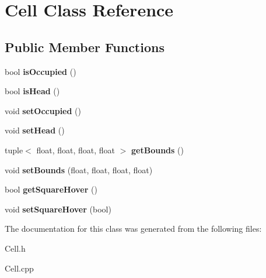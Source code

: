 \hypertarget{classCell}{}\section{Cell Class Reference}
\label{classCell}
\subsection*{Public Member Functions}
\begin{DoxyCompactItemize}
\item 
bool {\bfseries is\+Occupied} ()\hypertarget{classCell_a5f18a8962841567498aec286d23f153c}{}\label{classCell_a5f18a8962841567498aec286d23f153c}

\item 
bool {\bfseries is\+Head} ()\hypertarget{classCell_a071d12e8c85897affa572e71f681b7ab}{}\label{classCell_a071d12e8c85897affa572e71f681b7ab}

\item 
void {\bfseries set\+Occupied} ()\hypertarget{classCell_a4c6f53c6da9c60f6389873a50ce9d206}{}\label{classCell_a4c6f53c6da9c60f6389873a50ce9d206}

\item 
void {\bfseries set\+Head} ()\hypertarget{classCell_a94f6061a611acdee0a8eac2cbffd4e99}{}\label{classCell_a94f6061a611acdee0a8eac2cbffd4e99}

\item 
tuple$<$ float, float, float, float $>$ {\bfseries get\+Bounds} ()\hypertarget{classCell_a9ba09bf14fe823ba830e134febdd8301}{}\label{classCell_a9ba09bf14fe823ba830e134febdd8301}

\item 
void {\bfseries set\+Bounds} (float, float, float, float)\hypertarget{classCell_a743b44fced5dac88229c9533a604fc10}{}\label{classCell_a743b44fced5dac88229c9533a604fc10}

\item 
bool {\bfseries get\+Square\+Hover} ()\hypertarget{classCell_afe7e2092a8d2eb880c29c1729c9f3656}{}\label{classCell_afe7e2092a8d2eb880c29c1729c9f3656}

\item 
void {\bfseries set\+Square\+Hover} (bool)\hypertarget{classCell_a7fa0f371355d415799f833b1a17c699f}{}\label{classCell_a7fa0f371355d415799f833b1a17c699f}

\end{DoxyCompactItemize}


The documentation for this class was generated from the following files\+:\begin{DoxyCompactItemize}
\item 
Cell.\+h\item 
Cell.\+cpp\end{DoxyCompactItemize}
